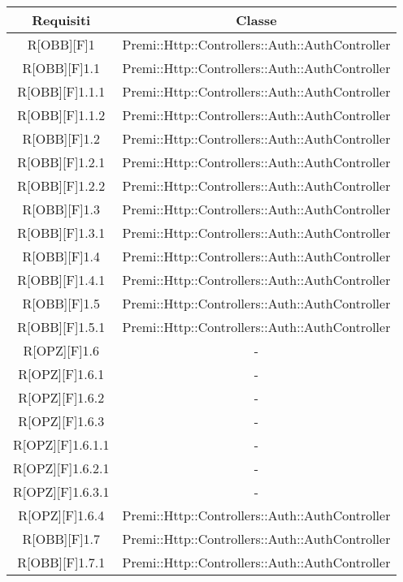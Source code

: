 \begin{table}[h]
	\begin{center}
		\begin{tabular}{|c|c|}
			\toprule
			\textbf{Requisiti} & \textbf{Classe}\\
		\midrule
			R[OBB][F]1 & Premi::Http::Controllers::Auth::AuthController\\
		\midrule
			R[OBB][F]1.1 & Premi::Http::Controllers::Auth::AuthController\\
		\midrule
			R[OBB][F]1.1.1 & Premi::Http::Controllers::Auth::AuthController\\
		\midrule
			R[OBB][F]1.1.2 & Premi::Http::Controllers::Auth::AuthController\\
		\midrule
			R[OBB][F]1.2 & Premi::Http::Controllers::Auth::AuthController\\
		\midrule
			R[OBB][F]1.2.1 & Premi::Http::Controllers::Auth::AuthController\\
		\midrule
			R[OBB][F]1.2.2 & Premi::Http::Controllers::Auth::AuthController\\
		\midrule
			R[OBB][F]1.3 & Premi::Http::Controllers::Auth::AuthController\\
		\midrule
			R[OBB][F]1.3.1 & Premi::Http::Controllers::Auth::AuthController\\
		\midrule
			R[OBB][F]1.4 & Premi::Http::Controllers::Auth::AuthController\\
		\midrule
			R[OBB][F]1.4.1 & Premi::Http::Controllers::Auth::AuthController\\
		\midrule
			R[OBB][F]1.5 & Premi::Http::Controllers::Auth::AuthController\\
		\midrule
			R[OBB][F]1.5.1 & Premi::Http::Controllers::Auth::AuthController\\
		\midrule
			R[OPZ][F]1.6 & -\\
		\midrule
			R[OPZ][F]1.6.1 & -\\
		\midrule
			R[OPZ][F]1.6.2 & -\\
		\midrule
			R[OPZ][F]1.6.3 & -\\
		\midrule
			R[OPZ][F]1.6.1.1 & -\\
		\midrule
			R[OPZ][F]1.6.2.1 & -\\
		\midrule
			R[OPZ][F]1.6.3.1 & -\\
		\midrule
			R[OPZ][F]1.6.4 & Premi::Http::Controllers::Auth::AuthController\\
		\midrule
			R[OBB][F]1.7 & Premi::Http::Controllers::Auth::AuthController\\
		\midrule
			R[OBB][F]1.7.1 & Premi::Http::Controllers::Auth::AuthController\\

\end{tabular}
\end{center}
\end{table}

